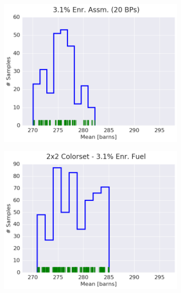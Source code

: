 \begin{figure}[h!]
\begin{subfigure}{0.5\textwidth}
  \centering
  \includegraphics[width=\linewidth]{figures/patterns/assm-3.1-20BPs/hist-kde-rug/assm-31-20BPs-fiss-2}
  \caption{}
  \label{fig:chap9-hist-assm-3.1-20BPs-fiss}
\end{subfigure}%
\begin{subfigure}{0.5\textwidth}
  \centering
  \includegraphics[width=\linewidth]{figures/patterns/2x2/hist-kde-rug/31-enr-fiss-2}
  \caption{}
  \label{fig:chap9-hist-2x2-3.1-fiss}
\end{subfigure}
\begin{subfigure}{0.5\textwidth}

\end{subfigure}
\end{figure}
